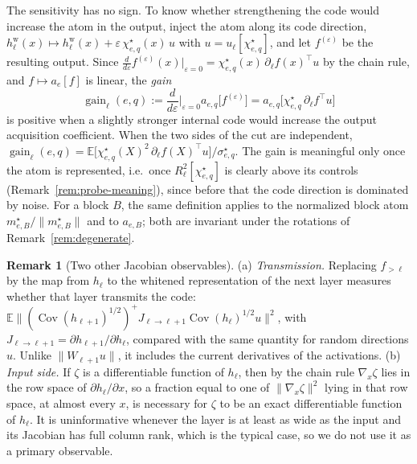 \documentclass[11pt]{article}
\newcommand{\E}{\mathbb{E}}
\newcommand{\norm}[1]{\lVert #1\rVert}
\newcommand{\Cov}{\operatorname{Cov}}
\theoremstyle{definition}
\newtheorem{remark}[theorem]{Remark}
\numberwithin{equation}{section}
\begin{document}
The sensitivity has no sign. To know whether strengthening the code would increase the atom in the output, inject the atom along its code direction, $h^{\mathrm w}_\ell(x)\mapsto h^{\mathrm w}_\ell(x)+\varepsilon\,\chi^\star_{e,q}(x)\,u$ with $u=u_\ell[\chi^\star_{e,q}]$, and let $f^{(\varepsilon)}$ be the resulting output. Since $\frac{d}{d\varepsilon}f^{(\varepsilon)}(x)\big|_{\varepsilon=0}=\chi^\star_{e,q}(x)\,\partial_\ell f(x)^\top u$ by the chain rule, and $f\mapsto a_e[f]$ is linear, the \emph{gain}
\[
\operatorname{gain}_\ell(e,q):=\frac{d}{d\varepsilon}\Big|_{\varepsilon=0}a_{e,q}\big[f^{(\varepsilon)}\big]=a_{e,q}\big[\chi^\star_{e,q}\,\partial_\ell f^\top u\big]
\]
is positive when a slightly stronger internal code would increase the output acquisition coefficient. When the two sides of the cut are independent, $\operatorname{gain}_\ell(e,q)=\E\big[\chi^\star_{e,q}(X)^2\,\partial_\ell f(X)^\top u\big]/\sigma^\star_{e,q}$. The gain is meaningful only once the atom is represented, i.e.\ once $R^2_\ell[\chi^\star_{e,q}]$ is clearly above its controls (Remark~\ref{rem:probe-meaning}), since before that the code direction is dominated by noise. For a block $B$, the same definition applies to the normalized block atom $m^\star_{e,B}/\norm{m^\star_{e,B}}$ and to $a_{e,B}$; both are invariant under the rotations of Remark~\ref{rem:degenerate}.

\begin{remark}[Two other Jacobian observables]\label{rem:other-jacobians}
(a) \emph{Transmission.} Replacing $f_{>\ell}$ by the map from $h_\ell$ to the whitened representation of the next layer measures whether that layer transmits the code: $\E\norm{(\Cov(h_{\ell+1})^{1/2})^+J_{\ell\to\ell+1}\Cov(h_\ell)^{1/2}u}^2$, with $J_{\ell\to\ell+1}=\partial h_{\ell+1}/\partial h_\ell$, compared with the same quantity for random directions $u$. Unlike $\norm{W_{\ell+1}u}$, it includes the current derivatives of the activations. (b) \emph{Input side.} If $\zeta$ is a differentiable function of $h_\ell$, then by the chain rule $\nabla_x\zeta$ lies in the row space of $\partial h_\ell/\partial x$, so a fraction equal to one of $\norm{\nabla_x\zeta}^2$ lying in that row space, at almost every $x$, is necessary for $\zeta$ to be an exact differentiable function of $h_\ell$. It is uninformative whenever the layer is at least as wide as the input and its Jacobian has full column rank, which is the typical case, so we do not use it as a primary observable.
\end{remark}
\end{document}
